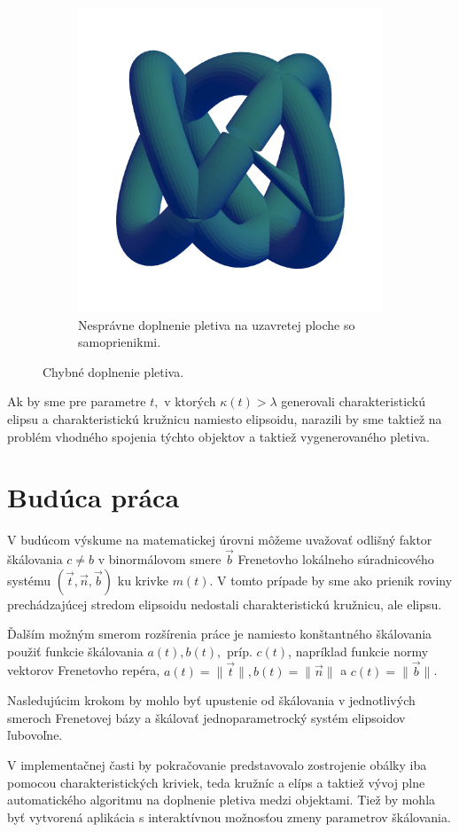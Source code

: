 \begin{figure}[h]
\begin{subfigure}[b]{0.49\textwidth}
        \includegraphics[width=\textwidth]{images/interpolacia_diery.png}
        	\caption{Nesprávne doplnenie pletiva na uzavretej ploche so samoprienikmi.}
        \label{fig:spojenie_kruznic_2}
    \end{subfigure}
    	\caption[Chybné doplnenie pletiva.]{Chybné doplnenie pletiva.}
    \label{fig:spojenie_kruznic}
\end{figure}

Ak by sme pre parametre $t,$ v ktorých $\kappa(t) > \lambda $ generovali charakteristickú elipsu a charakteristickú kružnicu namiesto elipsoidu, narazili by sme taktiež na problém vhodného spojenia týchto objektov a taktiež vygenerovaného pletiva.
\section{Budúca práca}
V budúcom výskume na matematickej úrovni môžeme uvažovať odlišný faktor škálovania $c \neq b$ v binormálovom smere $\vec{b}$ Frenetovho lokálneho súradnicového systému $(\vec{t}, \vec{n}, \vec{b})$ ku krivke $m(t)$. V tomto prípade by sme ako prienik roviny prechádzajúcej stredom elipsoidu nedostali charakteristickú kružnicu, ale elipsu.

Ďalším možným smerom rozšírenia práce je namiesto konštantného škálovania použiť funkcie škálovania $a(t), b(t),$ príp. $c(t)$, napríklad funkcie normy vektorov Frenetovho repéra, $a(t) = \| \vec{t} \|, b(t) = \| \vec{n} \| $ a $c(t) = \| \vec{b} \|$. 

Nasledujúcim krokom by mohlo byť upustenie od škálovania v jednotlivých smeroch Frenetovej bázy a škálovať jednoparametrocký systém elipsoidov ľubovoľne.

V implementačnej časti by pokračovanie predstavovalo zostrojenie obálky iba pomocou charakteristických kriviek, teda kružníc a elíps a taktiež vývoj plne automatického algoritmu na doplnenie pletiva medzi objektami. Tiež by mohla byť vytvorená aplikácia s interaktívnou možnosťou zmeny parametrov škálovania.
